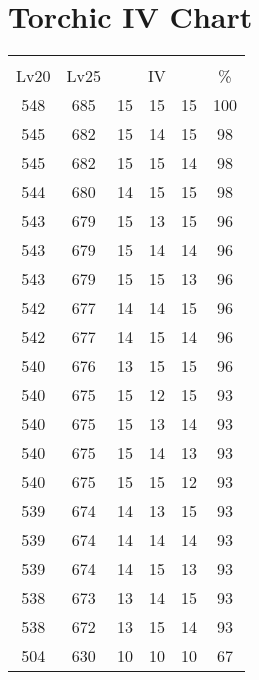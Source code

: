 \documentclass{article}%
\begin{document}
%
\normalsize%
\section{Torchic IV Chart}%
\label{sec:Torchic IV Chart}%
\renewcommand{\arraystretch}{1.5}%
\begin{tabular}{|c|c|c|c|c|c|}%
\hline%
\multicolumn{6}{|c|}{\textcolor{white}{ 
\linebreak{Torchic}
}%
\cellcolor{black}}\\%
\multicolumn{1}{|c}{Lv20}&\multicolumn{1}{c|}{Lv25}&\multicolumn{3}{c|}{IV}&\multicolumn{1}{|c|}{\%}\\%
\hline%
\rowcolor{color100}%
548&685&15&15&15&100\\%
\hline%
\rowcolor{color98}%
545&682&15&14&15&98\\%
\hline%
\rowcolor{color98}%
545&682&15&15&14&98\\%
\hline%
\rowcolor{color98}%
544&680&14&15&15&98\\%
\hline%
\rowcolor{color96}%
543&679&15&13&15&96\\%
\hline%
\rowcolor{color96}%
543&679&15&14&14&96\\%
\hline%
\rowcolor{color96}%
543&679&15&15&13&96\\%
\hline%
\rowcolor{color96}%
542&677&14&14&15&96\\%
\hline%
\rowcolor{color96}%
542&677&14&15&14&96\\%
\hline%
\rowcolor{color96}%
540&676&13&15&15&96\\%
\hline%
\rowcolor{color93}%
540&675&15&12&15&93\\%
\hline%
\rowcolor{color93}%
540&675&15&13&14&93\\%
\hline%
\rowcolor{color93}%
540&675&15&14&13&93\\%
\hline%
\rowcolor{color93}%
540&675&15&15&12&93\\%
\hline%
\rowcolor{color93}%
539&674&14&13&15&93\\%
\hline%
\rowcolor{color93}%
539&674&14&14&14&93\\%
\hline%
\rowcolor{color93}%
539&674&14&15&13&93\\%
\hline%
\rowcolor{color93}%
538&673&13&14&15&93\\%
\hline%
\rowcolor{color93}%
538&672&13&15&14&93\\%
\hline%
\rowcolor{color91}%
504&630&10&10&10&67\\%
\end{tabular}

%
\end{document}
